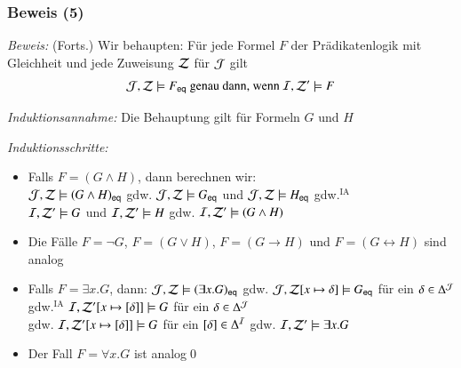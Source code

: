 \documentclass[aspectratio=1610,onlymath]{beamer}
\begin{document}
\begin{frame}[t]\frametitle{Beweis (5)}


\emph{Beweis:} {\footnotesize(Forts.)}
Wir behaupten: Für jede Formel $F$ der Prädikatenlogik mit Gleichheit und jede Zuweisung $\mathcal{Z}$ für $\mathcal{J}$ gilt
\[ \mathcal{J},\mathcal{Z}\models F_{\textsf{eq}} \text{ genau dann, wenn } \mathcal{I},\mathcal{Z}'\models F \]


\emph{Induktionsannahme:} Die Behauptung gilt für Formeln $G$ und $H$ \medskip\pause

\emph{Induktionsschritte:}
\begin{itemize}
\item Falls $F=(G\wedge H)$, dann berechnen wir:\pause\\
$\mathcal{J},\mathcal{Z}\models (G\wedge H)_{\textsf{eq}}$
\alert{gdw.} $\mathcal{J},\mathcal{Z}\models G_{\textsf{eq}}$ und $\mathcal{J},\mathcal{Z}\models H_{\textsf{eq}}$ \pause\alert{gdw.${}^{\text{IA}}$}\\
$\mathcal{I},\mathcal{Z}'\models G$ und $\mathcal{I},\mathcal{Z}'\models H$ \pause\alert{gdw.} $\mathcal{I},\mathcal{Z}'\models (G\wedge H)$\pause
\item Die Fälle $F=\neg G$, $F=(G\vee H)$, $F=(G\to H)$ und $F=(G\leftrightarrow H)$ sind analog\pause
\item Falls $F=\exists x.G$, dann: $\mathcal{J},\mathcal{Z}\models (\exists x.G)_{\textsf{eq}}$ \alert{gdw.}
$\mathcal{J},\mathcal{Z}[x\mapsto \delta]\models G_{\textsf{eq}}$ für ein $\delta\in\Delta^{\mathcal{J}}$\\
\pause\alert{gdw.${}^{\text{IA}}$}
$\mathcal{I},\mathcal{Z}'[x\mapsto [\delta]]\models G$ für ein $\delta\in\Delta^{\mathcal{J}}$
 \pause\\\alert{gdw.}
 $\mathcal{I},\mathcal{Z}'[x\mapsto [\delta]]\models G$ für ein $[\delta]\in\Delta^{\mathcal{I}}$
\alert{gdw.} $\mathcal{I},\mathcal{Z}'\models \exists x.G$\pause
\item Der Fall $F=\forall x.G$ ist analog\qed
\end{itemize}
\end{frame}
\end{document}
